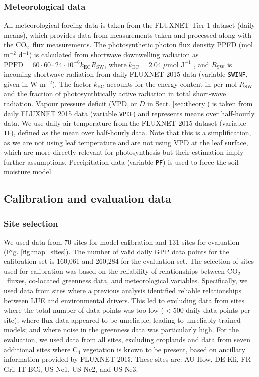 \documentclass[gmd, manuscript]{copernicus}
\newcommand{\coo}{CO$_2$}
\begin{document}
\subsubsection{Meteorological data}
\label{sec:ppfd}
All meteorological forcing data is taken from the FLUXNET Tier 1 dataset (daily means), which provides data from measurements taken and processed along with the \coo\ flux measurements. The photosynthetic photon flux density PPFD (mol m$^{-2}$ d$^{-1}$) is calculated from shortwave downwelling radiation as $\text{PPFD} = 60 \cdot 60 \cdot 24 \cdot 10^{-6} k_\text{EC} R_{\text{SW}}$, where $k_\text{EC} = 2.04\; \mu \text{mol J}^{-1}$ \citep{meek84}, and $R_{\text{SW}}$ is incoming shortwave radiation from daily FLUXNET 2015 data (variable \texttt{SW\textunderscore IN\textunderscore F}, given in W m$^{-2}$). The factor $k_\text{EC}$ accounts for the energy content in per mol $R_\text{SW}$ and the fraction of photosynthtically active radiation in total short-wave radiation. Vapour pressure deficit (VPD, or $D$ in Sect. \ref{sec:theory}) is taken from daily FLUXNET 2015 data (variable \texttt{VPD\textunderscore F}) and represents means over half-hourly data. We use daily air temperature from the FLUXNET 2015 dataset (variable \texttt{T\textunderscore F}), defined as the mean over half-hourly data. Note that this is a simplification, as we are not using leaf temperature and are not using VPD at the leaf surface, which are more directly relevant for photosynthesis but their estimation imply further assumptions. Precipitation data (variable \texttt{P\textunderscore F}) is used to force the soil moisture model.

\subsection{Calibration and evaluation data}

\label{sec:calibdata}

\subsubsection{Site selection}
We used data from 70 sites for model calibration and 131 sites for evaluation (Fig. \ref{fig:map_sites}). The number of valid daily GPP data points for the calibration set is 160,061 and 260,284 for the evaluation set. The selection of sites used for calibration was based on the reliability of relationships between \coo\ fluxes, co-located greenness data, and meteorological variables. Specifically, we used data from sites where a previous analysis \citep{stocker18newphyt} identified reliable relationships between LUE and environmental drivers. This led to excluding data from sites where the total number of data points was too low ($<$500 daily data points per site); where flux data appeared to be unreliable, leading to unreliably trained models; and where noise in the greenness data was particularly high. For the evaluation, we used data from all sites, excluding croplands and data from seven additional sites where C$_4$ vegetation is known to be present, based on ancillary information provided by FLUXNET 2015. These sites are: AU-How, DE-Kli, FR-Gri, IT-BCi, US-Ne1, US-Ne2, and US-Ne3.
\end{document}
